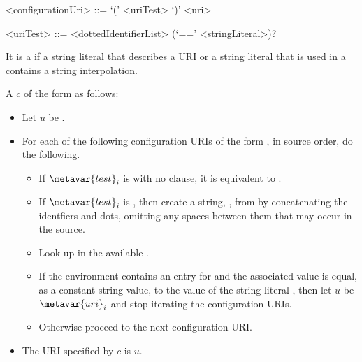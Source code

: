 \documentclass[makeidx]{article}
\begin{document}
{\begin{grammar}
<configurationUri> ::= \IF{} `(' <uriTest> `)' <uri>

<uriTest> ::= <dottedIdentifierList> (`==' <stringLiteral>)?
\end{grammar}

\LMHash{}%
It is a  if a string literal that describes a URI
or a string literal that is used in a 
contains a string interpolation.

\LMHash{}%
A  $c$ of the form
 as follows:
\begin{itemize}
\item
  Let $u$ be .
\item
  For each of the following configuration URIs of the form
  ,
  in source order, do the following.
  \begin{itemize}
  \item
    If $\metavar{test}_i$ is 
    with no \lit{==} clause, it is
    equivalent to .
  \item
    If $\metavar{test}_i$ is ,
    then create a string, , from 
    by concatenating the identfiers and dots,
    omitting any spaces between them that may occur in the source.
  \item
    Look up  in the available
    .
  \item
    If the environment contains an entry for  and the
    associated value is equal, as a constant string value, to the value of
    the string literal ,
    then let $u$ be $\metavar{uri}_i$ and stop iterating the configuration URIs.
  \item
    Otherwise proceed to the next configuration URI.
  \end{itemize}
\item
  The URI specified by $c$ is $u$.
\end{itemize}

}
\end{document}
